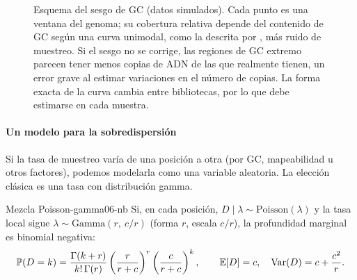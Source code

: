 \begin{figure}[t]
\centering
{}
\caption[Sesgo de GC en la cobertura]{Esquema del sesgo de GC (datos simulados). Cada punto es una ventana del genoma; su cobertura relativa depende del contenido de GC según una curva unimodal, como la descrita por \textcite{c06-benjamini2012}, más ruido de muestreo. Si el sesgo no se corrige, las regiones de GC extremo parecen tener menos copias de ADN de las que realmente tienen, un error grave al estimar variaciones en el número de copias. La forma exacta de la curva cambia entre bibliotecas, por lo que debe estimarse en cada muestra.}
\label{fig:06-gc}
\end{figure}

\paragraph{Un modelo para la sobredispersión} Si la tasa de muestreo varía de una posición a otra (por GC, mapeabilidad u otros factores), podemos modelarla como una variable aleatoria. La elección clásica es una tasa con distribución gamma.

\begin{teorema}{Mezcla Poisson-gamma}{06-nb}
Si, en cada posición, $D\mid\lambda\sim\mathrm{Poisson}(\lambda)$ y la tasa local sigue $\lambda\sim\mathrm{Gamma}(r,\ c/r)$ (forma $r$, escala $c/r$), la profundidad marginal es binomial negativa:
\begin{equation}\label{eq:06-nb}
\mathbb{P}(D=k)=\frac{\Gamma(k+r)}{k!\,\Gamma(r)}\left(\frac{r}{r+c}\right)^{r}\left(\frac{c}{r+c}\right)^{k},
\qquad \mathbb{E}[D]=c,\quad \operatorname{Var}(D)=c+\frac{c^2}{r}.
\end{equation}
\end{teorema}

